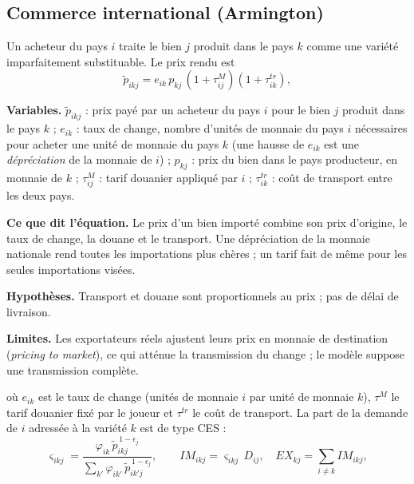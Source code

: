 \documentclass[11pt,a4paper]{article}
\newcommand{\variables}{\par\noindent\textbf{Variables.} }
\newcommand{\sens}{\par\noindent\textbf{Ce que dit l'équation.} }
\newcommand{\hyp}{\par\noindent\textbf{Hypothèses.} }
\newcommand{\limites}{\par\noindent\textbf{Limites.} }
\begin{document}
\subsection{Commerce international (Armington)}
Un acheteur du pays $i$ traite le bien $j$ produit dans le pays $k$ comme une variété imparfaitement substituable. Le prix rendu est
\begin{equation}
\tilde p_{ikj} = e_{ik}\, p_{kj}\,(1+\tau^M_{ij})(1+\tau^{tr}_{ik}),
\end{equation}
\begin{lecture}
\variables $\tilde p_{ikj}$ : prix payé par un acheteur du pays $i$ pour le bien $j$ produit dans le pays $k$ ; $e_{ik}$ : taux de change, nombre d'unités de monnaie du pays $i$ nécessaires pour acheter une unité de monnaie du pays $k$ (une hausse de $e_{ik}$ est une \emph{dépréciation} de la monnaie de $i$) ; $p_{kj}$ : prix du bien dans le pays producteur, en monnaie de $k$ ; $\tau^M_{ij}$ : tarif douanier appliqué par $i$ ; $\tau^{tr}_{ik}$ : coût de transport entre les deux pays.
\sens Le prix d'un bien importé combine son prix d'origine, le taux de change, la douane et le transport. Une dépréciation de la monnaie nationale rend toutes les importations plus chères ; un tarif fait de même pour les seules importations visées.
\hyp Transport et douane sont proportionnels au prix ; pas de délai de livraison.
\limites Les exportateurs réels ajustent leurs prix en monnaie de destination (\emph{pricing to market}), ce qui atténue la transmission du change ; le modèle suppose une transmission complète.
\end{lecture}
où $e_{ik}$ est le taux de change (unités de monnaie $i$ par unité de monnaie $k$), $\tau^M$ le tarif douanier fixé par le joueur et $\tau^{tr}$ le coût de transport. La part de la demande de $i$ adressée à la variété $k$ est de type CES :
\begin{equation}
\varsigma_{ikj} = \frac{\varphi_{ik}\,\tilde p_{ikj}^{\,1-\epsilon_j}}{\sum_{k'} \varphi_{ik'}\,\tilde p_{ik'j}^{\,1-\epsilon_j}}, \qquad
IM_{ikj} = \varsigma_{ikj}\, D_{ij}, \quad EX_{kj} = \sum_{i\neq k} IM_{ikj},
\label{eq:armington}
\end{equation}
\end{document}
